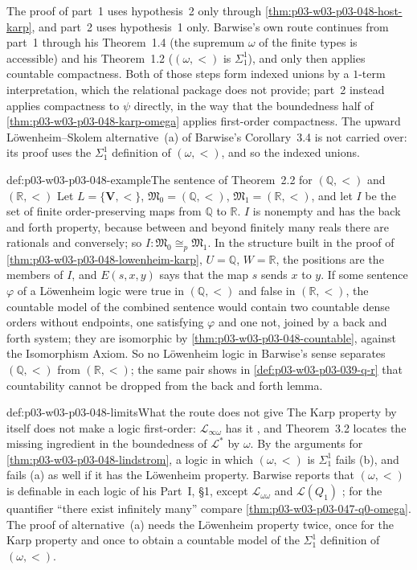 The proof of part~1 uses hypothesis~2 only through
\cref{thm:p03-w03-p03-048-host-karp}, and part~2 uses hypothesis~1 only.
Barwise's own route continues from part~1 through his Theorem~1.4 (the
supremum \(\omega\) of the finite types is accessible) and his Theorem~1.2
(\((\omega,<)\) is \(\Sigma^1_1\)), and only then applies countable
compactness.  Both of those steps form indexed unions by a \(1\)-term
interpretation, which the relational package does not provide; part~2
instead applies compactness to \(\psi\) directly, in the way that the
boundedness half of \cref{thm:p03-w03-p03-048-karp-omega} applies
first-order compactness.  The upward L\"owenheim--Skolem alternative~(a) of
Barwise's Corollary~3.4 is not carried over: its proof uses the
\(\Sigma^1_1\) definition of \((\omega,<)\), and so the indexed unions.
\begin{hbexample}{def:p03-w03-p03-048-example}{The sentence of Theorem~2.2 for \((\mathbb Q,<)\) and \((\mathbb R,<)\)}
Let \(L=\{\mathbf V,<\}\), \(\mathfrak M_0=(\mathbb Q,<)\),
\(\mathfrak M_1=(\mathbb R,<)\), and let \(I\) be the set of finite
order-preserving maps from \(\mathbb Q\) to \(\mathbb R\).  \(I\) is
nonempty and has the back and forth property, because between and beyond
finitely many reals there are rationals and conversely; so
\(I:\mathfrak M_0\cong_{p}\mathfrak M_1\).  In the structure built in the
proof of \cref{thm:p03-w03-p03-048-lowenheim-karp}, \(U=\mathbb Q\),
\(W=\mathbb R\), the positions are the members of \(I\), and \(E(s,x,y)\)
says that the map \(s\) sends \(x\) to \(y\).  If some sentence \(\varphi\)
of a L\"owenheim logic were true in \((\mathbb Q,<)\) and false in
\((\mathbb R,<)\), the countable model of the combined sentence would
contain two countable dense orders without endpoints, one satisfying
\(\varphi\) and one not, joined by a back and forth system; they are
isomorphic by \cref{thm:p03-w03-p03-048-countable}, against the Isomorphism
Axiom.  So no L\"owenheim logic in Barwise's sense separates
\((\mathbb Q,<)\) from \((\mathbb R,<)\); the same pair shows in
\cref{def:p03-w03-p03-039-q-r} that countability cannot be dropped from the
back and forth lemma.
\end{hbexample}

\begin{hbwarning}{def:p03-w03-p03-048-limits}{What the route does not give}
The Karp property by itself does not make a logic first-order:
\(\mathcal L_{\infty\omega}\) has it \cite[Part~I, \S10, 10.3, p.~244;
Part~II, p.~256]{Barwise1974Axioms}, and Theorem~3.2 locates the missing
ingredient in the boundedness of \(\mathcal L^{\ast}\) by \(\omega\).  By
the arguments for \cref{thm:p03-w03-p03-048-lindstrom}, a logic in which
\((\omega,<)\) is \(\Sigma^1_1\) fails (b), and fails (a) as well if it has
the L\"owenheim property.  Barwise reports that \((\omega,<)\) is definable
in each logic of his Part~I, \S1, except \(\mathcal L_{\omega\omega}\) and
\(\mathcal L(Q_1)\) \cite[Part~II, \S1, p.~250]{Barwise1974Axioms}; for the
quantifier ``there exist infinitely many'' compare
\cref{thm:p03-w03-p03-047-q0-omega}.  The proof of alternative~(a) needs the L\"owenheim property
twice, once for the Karp property and once to obtain a countable model of
the \(\Sigma^1_1\) definition of \((\omega,<)\).
\end{hbwarning}
